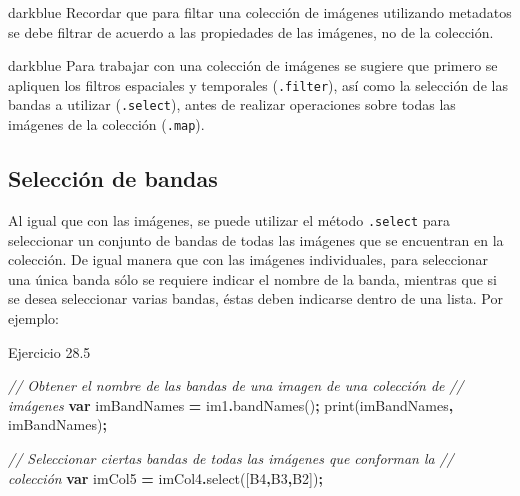 \documentclass[
  12pt,
  letterpaper,
  twoside]{book}
\newenvironment{Shaded}{\begin{snugshade}}{\end{snugshade}}
\newcommand{\CommentTok}[1]{\textcolor[rgb]{0.56,0.35,0.01}{\textit{#1}}}
\newcommand{\FunctionTok}[1]{\textcolor[rgb]{0.00,0.00,0.00}{#1}}
\newcommand{\KeywordTok}[1]{\textcolor[rgb]{0.13,0.29,0.53}{\textbf{#1}}}
\newcommand{\NormalTok}[1]{#1}
\newcommand{\OperatorTok}[1]{\textcolor[rgb]{0.81,0.36,0.00}{\textbf{#1}}}
\newcommand{\StringTok}[1]{\textcolor[rgb]{0.31,0.60,0.02}{#1}}
\begin{document}
\begin{bluebox2}

\begin{awesomeblock}{5pt}{\faLightbulb}{darkblue}
Recordar que para filtar una colección de imágenes utilizando metadatos se debe filtrar de acuerdo a las propiedades de las imágenes, no de la colección.

\end{awesomeblock}

\end{bluebox2}

\begin{bluebox2}

\begin{awesomeblock}{5pt}{\faLightbulb}{darkblue}
Para trabajar con una colección de imágenes se sugiere que primero se apliquen los filtros espaciales y temporales (\texttt{.filter}), así como la selección de las bandas a utilizar (\texttt{.select}), antes de realizar operaciones sobre todas las imágenes de la colección (\texttt{.map}).

\end{awesomeblock}

\end{bluebox2}

\hypertarget{selecciuxf3n-de-bandas-1}{%
\subsection{Selección de bandas}\label{selecciuxf3n-de-bandas-1}}

Al igual que con las imágenes, se puede utilizar el método \texttt{.select} para seleccionar un conjunto de bandas de todas las imágenes que se encuentran en la colección. De igual manera que con las imágenes individuales, para seleccionar una única banda sólo se requiere indicar el nombre de la banda, mientras que si se desea seleccionar varias bandas, éstas deben indicarse dentro de una lista. Por ejemplo:

Ejercicio 28.5

\begin{Shaded}
\begin{Highlighting}[]
\CommentTok{// Obtener el nombre de las bandas de una imagen de una colección de }
\CommentTok{// imágenes}
\KeywordTok{var}\NormalTok{ imBandNames }\OperatorTok{=}\NormalTok{ im1}\OperatorTok{.}\FunctionTok{bandNames}\NormalTok{()}\OperatorTok{;}
\FunctionTok{print}\NormalTok{(imBandNames}\OperatorTok{,} \StringTok{\textquotesingle{}imBandNames\textquotesingle{}}\NormalTok{)}\OperatorTok{;}

\CommentTok{// Seleccionar ciertas bandas de todas las imágenes que conforman la }
\CommentTok{// colección}
\KeywordTok{var}\NormalTok{ imCol5 }\OperatorTok{=}\NormalTok{ imCol4}\OperatorTok{.}\FunctionTok{select}\NormalTok{([}\StringTok{\textquotesingle{}B4\textquotesingle{}}\OperatorTok{,}\StringTok{\textquotesingle{}B3\textquotesingle{}}\OperatorTok{,}\StringTok{\textquotesingle{}B2\textquotesingle{}}\NormalTok{])}\OperatorTok{;}
\end{Highlighting}
\end{Shaded}
\end{document}
